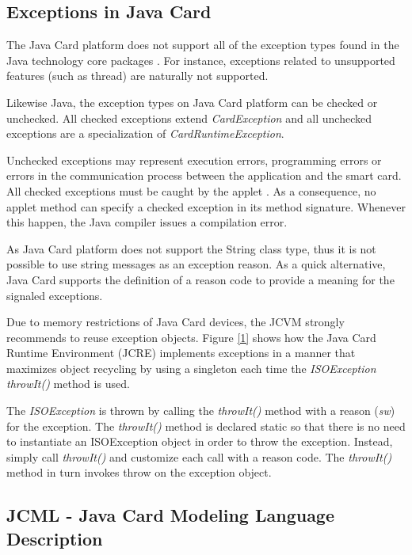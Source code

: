 \documentclass[10pt, conference, compsocconf]{IEEEtran}
\begin{document}
\subsection{Exceptions in Java Card}

The Java Card platform does not support all of the
exception types found in the Java technology core
packages \cite{apiJavaCard}. For instance, exceptions related to
unsupported features (such as thread) are naturally not
supported.

Likewise Java, the exception types on Java Card
platform can be checked or unchecked. All checked
exceptions extend \textit{CardException} and all unchecked
exceptions are a specialization of \textit{CardRuntimeException}.

Unchecked exceptions may represent execution errors,
programming errors or errors in the communication
process between the application and the smart card. All
checked exceptions must be caught by the applet \cite{Chen:2000}. As a
consequence, no applet method can specify a checked
exception in its method signature. Whenever this happen,
the Java compiler issues a compilation error. 

As Java Card platform does not support the String
class type, thus it is not possible to use string messages as
an exception reason. As a quick alternative, Java Card
supports the definition of a reason code to provide a
meaning for the signaled exceptions.

Due to memory restrictions of Java Card devices, the
JCVM strongly recommends to reuse exception objects.
Figure \ref{1} shows how the Java Card Runtime Environment
(JCRE) implements exceptions in a manner that
maximizes object recycling by using a singleton each time
the \textit{ISOException throwIt()} method is used.

The \textit{ISOException} is thrown by calling the \textit{throwIt()}
method with a reason (\textit{sw}) for the exception. The
\textit{throwIt()} method is declared static so that there is no need
to instantiate an ISOException object in order to throw the
exception. Instead, simply call \textit{throwIt()} and customize
each call with a reason code. The \textit{throwIt()} method in turn
invokes throw on the exception object.

\begin{figure}

\end{figure}


\subsection{JCML - Java Card Modeling Language Description}
\end{document}
